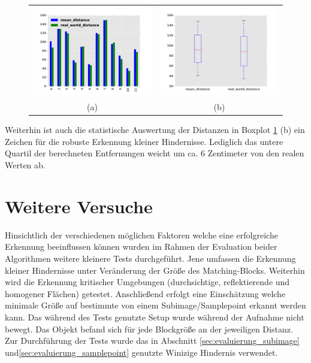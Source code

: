 \begin{figure}[h]
	\centering
	\begin{tabular}{cc}
	\includegraphics[width=7cm]{img/evaluation/diagrams/sample_tiny_bar}&
	\includegraphics[width=7cm]{img/evaluation/diagrams/sample_tiny_box}\\
	 (a) & (b)
	\end{tabular}
	\caption{}
    \label{fig:sample_eval_tiny}
\end{figure}

\noindent
Weiterhin ist auch die statistische Auswertung der Distanzen in Boxplot \ref{fig:sample_eval_tiny} (b) ein Zeichen für die robuste Erkennung kleiner Hindernisse. Lediglich das untere Quartil der berechneten Entfernungen weicht um ca. 6 Zentimeter von den realen Werten ab.

\section{Weitere Versuche}
\label{sec:further_tests}

Hinsichtlich der verschiedenen möglichen Faktoren welche eine erfolgreiche Erkennung beeinflussen können wurden im Rahmen der Evaluation beider Algorithmen weitere kleinere Tests durchgeführt. Jene umfassen die Erkennung kleiner Hindernisse unter Veränderung der Größe des Matching-Blocks. Weiterhin wird die Erkennung kritischer Umgebungen (durchsichtige, reflektierende und homogener Flächen) getestet. Anschließend erfolgt eine Einschätzung welche minimale Größe auf bestimmte von einem Subimage/Samplepoint erkannt werden kann. Das während des Tests genutzte Setup wurde während der Aufnahme nicht bewegt. Das Objekt befand sich für jede Blockgröße an der jeweiligen Distanz. Zur Durchführung der Tests wurde das in Abschnitt \ref{sec:evaluierung_subimage} und\ref{sec:evaluierung_samplepoint} genutzte Winizige Hindernis verwendet.
	
